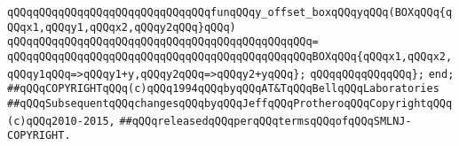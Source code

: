 \verb|qQQqqQQqqQQqqQQqqQQqqQQqqQQqqQQqfunqQQqy_offset_boxqQQqyqQQq(BOXqQQq{qQQqx1,qQQqy1,qQQqx2,qQQqy2qQQq}qQQq)|\newline
\verb|qQQqqQQqqQQqqQQqqQQqqQQqqQQqqQQqqQQqqQQqqQQqqQQq=|\newline
\verb|qQQqqQQqqQQqqQQqqQQqqQQqqQQqqQQqqQQqqQQqqQQqqQQqBOXqQQq{qQQqx1,qQQqx2,qQQqy1qQQq=>qQQqy1+y,qQQqy2qQQq=>qQQqy2+yqQQq};|\newline
\newline
\verb|qQQqqQQqqQQqqQQq};|\newline
\verb|end;|\newline
\newline
\verb|##qQQqCOPYRIGHTqQQq(c)qQQq1994qQQqbyqQQqAT&TqQQqBellqQQqLaboratories|\newline
\verb|##qQQqSubsequentqQQqchangesqQQqbyqQQqJeffqQQqProtheroqQQqCopyrightqQQq(c)qQQq2010-2015,|\newline
\verb|##qQQqreleasedqQQqperqQQqtermsqQQqofqQQqSMLNJ-COPYRIGHT.|\newline

